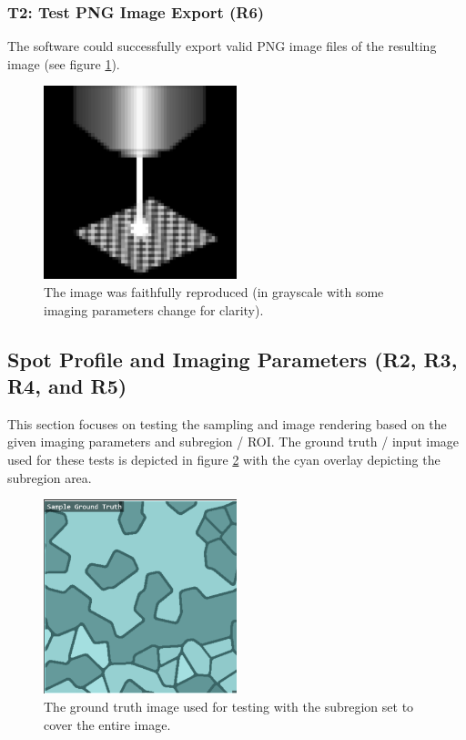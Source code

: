 \documentclass[12pt, titlepage]{article}
\begin{document}
\subsubsection{T2: Test PNG Image Export (R6)}
The software could successfully export valid PNG image files of the resulting image (see figure \ref{fig_t2}).
\begin{figure}[h!]
  \begin{center}
   \includegraphics[width=0.5\textwidth]{t2.png}
  \caption{The image was faithfully reproduced (in grayscale with some imaging parameters change for clarity).}
  \label{fig_t2}
  \end{center}
\end{figure}

\subsection{Spot Profile and Imaging Parameters (R2, R3, R4, and R5)}
This section focuses on testing the sampling and image rendering based on the given
imaging parameters and subregion / ROI. The ground truth / input image used for these tests
is depicted in figure \ref{fig_gt0} with the cyan overlay depicting the subregion area.

\begin{figure}[h!]
  \begin{center}
   \includegraphics[width=0.5\textwidth]{gt0.png}
  \caption{The ground truth image used for testing with the subregion set to cover the entire image.}
  \label{fig_gt0} 
  \end{center}
\end{figure}
\end{document}

